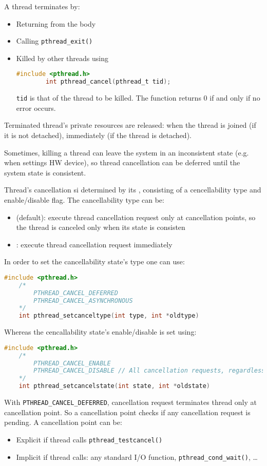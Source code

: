 A thread terminates by:
\begin{itemize}
    \item Returning from the body
    \item Calling \texttt{pthread\_exit()}
    \item Killed by other threads using
    \begin{lstlisting}[language=C]
        #include <pthread.h>
        int pthread_cancel(pthread_t tid);
    \end{lstlisting}
    \texttt{tid} is that of the thread to be killed. The function returns 0 if and only if no error occurs.
\end{itemize}

Terminated thread's private resources are released: when the thread is joined (if it is not detached), immediately (if the thread is detached).

Sometimes, killing a thread can leave the system in an inconsistent state (e.g. when settings HW device), so thread cancellation can be deferred until the system state is consistent.

Thread's cancellation si determined by its , consisting of a cencellability type and enable/disable flag.
The cancellability type can be:
\begin{itemize}
    \item {} (default): execute thread cancellation request only at cancellation points, so the thread is canceled only when its state is consisten
    \item {}: execute thread cancellation request immediately
\end{itemize}
In order to set the cancellability state's type one can use:
\begin{lstlisting}[language=C]
    #include <pthread.h>
    /*
        PTHREAD_CANCEL_DEFERRED
        PTHREAD_CANCEL_ASYNCHRONOUS
    */
    int pthread_setcanceltype(int type, int *oldtype)
\end{lstlisting}
Whereas the cencallability state's enable/disable is set using:
\begin{lstlisting}[language=C]
    #include <pthread.h>
    /*
        PTHREAD_CANCEL_ENABLE
        PTHREAD_CANCEL_DISABLE // All cancellation requests, regardless of type, are queued until cancellability is enabled again
    */
    int pthread_setcancelstate(int state, int *oldstate)
\end{lstlisting}

With \texttt{PTHREAD\_CANCEL\_DEFERRED}, cancellation request terminates thread only at cancellation point. So a cancellation point checks if any cancellation request is pending. A cancellation point can be:
\begin{itemize}
    \item Explicit if thread calls \texttt{pthread\_testcancel()}
    \item Implicit if thread calls: any standard I/O function, \texttt{pthread\_cond\_wait()}, \dots
\end{itemize}

